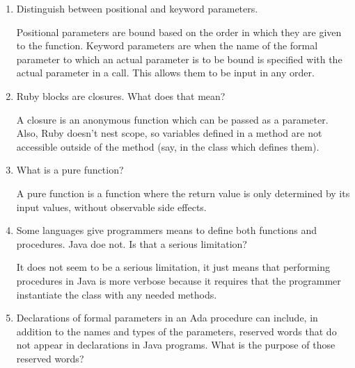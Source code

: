 \begin{enumerate}
  \item Distinguish between positional and keyword parameters.

  \begin{answer}

Positional parameters are bound based on the order in which they are given to the function. Keyword parameters are when the name of the formal parameter to which an actual parameter is to be bound is specified with the actual parameter in a call. This allows them to be input in any order.

    \end{answer}


  \item Ruby blocks are closures. What does that mean?

  \begin{answer}

A closure is an anonymous function which can be passed as a parameter. Also, Ruby doesn't nest scope, so variables defined in a method are not accessible outside of the method (say, in the class which defines them).

    \end{answer}


  \item What is a pure function?

  \begin{answer}

    A pure function is a function where the return value is only determined by its input values, without observable side effects.

    \end{answer}


  \item Some languages give programmers means to define
    both functions and procedures. Java doe not. Is that
    a serious limitation?

  \begin{answer}

   It does not seem to be a serious limitation, it just means that performing procedures in Java is more verbose because it requires that the programmer instantiate the class with any needed methods.

    \end{answer}


  \item Declarations of formal parameters in an Ada procedure
    can include, in addition to the names and types of the
    parameters, reserved words that do not appear in declarations
    in Java programs. 
    What is the purpose of those reserved words?
 

\end{enumerate}
